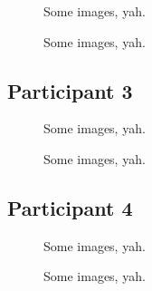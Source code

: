 \begin{figure}[h]
	\caption{Some images, yah.}
\end{figure}

\clearpage

\begin{figure}[h]
	\caption{Some images, yah.}
\end{figure}


\clearpage

\subsection{Participant 3}

\begin{figure}[h]
	\caption{Some images, yah.}
\end{figure}

\clearpage

\begin{figure}[h]
	\caption{Some images, yah.}
\end{figure}


\clearpage

\subsection{Participant 4}

\begin{figure}[h]
	\caption{Some images, yah.}
\end{figure}

\clearpage

\begin{figure}[h]
	\caption{Some images, yah.}
\end{figure}



